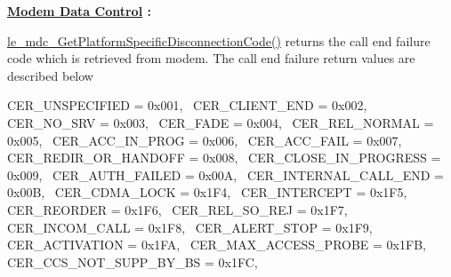 {\bfseries \hyperlink{c_mdc}{Modem Data Control} \+:}
\begin{DoxyItemize}
\item \hyperlink{le__mdc__interface_8h_a3e3a92b0f5e3edab9400412170517a62}{le\+\_\+mdc\+\_\+\+Get\+Platform\+Specific\+Disconnection\+Code()} returns the call end failure code which is retrieved from modem. The call end failure return values are described below

C\+E\+R\+\_\+\+U\+N\+S\+P\+E\+C\+I\+F\+I\+ED = 0x001,~\newline
 C\+E\+R\+\_\+\+C\+L\+I\+E\+N\+T\+\_\+\+E\+ND = 0x002,~\newline
 C\+E\+R\+\_\+\+N\+O\+\_\+\+S\+RV = 0x003,~\newline
 C\+E\+R\+\_\+\+F\+A\+DE = 0x004,~\newline
 C\+E\+R\+\_\+\+R\+E\+L\+\_\+\+N\+O\+R\+M\+AL = 0x005,~\newline
 C\+E\+R\+\_\+\+A\+C\+C\+\_\+\+I\+N\+\_\+\+P\+R\+OG = 0x006,~\newline
 C\+E\+R\+\_\+\+A\+C\+C\+\_\+\+F\+A\+IL = 0x007,~\newline
 C\+E\+R\+\_\+\+R\+E\+D\+I\+R\+\_\+\+O\+R\+\_\+\+H\+A\+N\+D\+O\+FF = 0x008,~\newline
 C\+E\+R\+\_\+\+C\+L\+O\+S\+E\+\_\+\+I\+N\+\_\+\+P\+R\+O\+G\+R\+E\+SS = 0x009,~\newline
 C\+E\+R\+\_\+\+A\+U\+T\+H\+\_\+\+F\+A\+I\+L\+ED = 0x00A,~\newline
 C\+E\+R\+\_\+\+I\+N\+T\+E\+R\+N\+A\+L\+\_\+\+C\+A\+L\+L\+\_\+\+E\+ND = 0x00B,~\newline
 C\+E\+R\+\_\+\+C\+D\+M\+A\+\_\+\+L\+O\+CK = 0x1\+F4,~\newline
 C\+E\+R\+\_\+\+I\+N\+T\+E\+R\+C\+E\+PT = 0x1\+F5,~\newline
 C\+E\+R\+\_\+\+R\+E\+O\+R\+D\+ER = 0x1\+F6,~\newline
 C\+E\+R\+\_\+\+R\+E\+L\+\_\+\+S\+O\+\_\+\+R\+EJ = 0x1\+F7,~\newline
 C\+E\+R\+\_\+\+I\+N\+C\+O\+M\+\_\+\+C\+A\+LL = 0x1\+F8,~\newline
 C\+E\+R\+\_\+\+A\+L\+E\+R\+T\+\_\+\+S\+T\+OP = 0x1\+F9,~\newline
 C\+E\+R\+\_\+\+A\+C\+T\+I\+V\+A\+T\+I\+ON = 0x1\+FA,~\newline
 C\+E\+R\+\_\+\+M\+A\+X\+\_\+\+A\+C\+C\+E\+S\+S\+\_\+\+P\+R\+O\+BE = 0x1\+FB,~\newline
 C\+E\+R\+\_\+\+C\+C\+S\+\_\+\+N\+O\+T\+\_\+\+S\+U\+P\+P\+\_\+\+B\+Y\+\_\+\+BS = 0x1\+FC,~\newline

\end{DoxyItemize}
